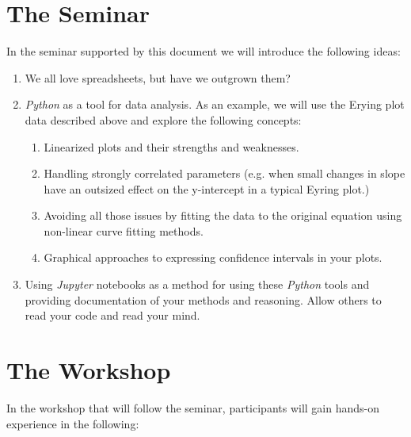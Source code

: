 \documentclass{tufte-handout}
\begin{document}
\section{The Seminar}

In the seminar supported by this document we will introduce the following ideas:

\begin{enumerate}

\item We all love spreadsheets, but have we outgrown them?

\item \textit{Python} as a tool for data analysis. As an example, we will use the Erying plot data described above and explore the following concepts:

\begin{enumerate}

\item Linearized plots and their strengths and weaknesses.
\item Handling strongly correlated parameters (e.g. when small changes in slope have an outsized effect on the y-intercept in a typical Eyring plot.)
\item Avoiding all those issues by fitting the data to the original equation using non-linear curve fitting methods.
\item Graphical approaches to expressing confidence intervals in your plots.

\end{enumerate}

\item Using \textit{Jupyter} notebooks as a method for using these \textit{Python} tools and providing documentation of your methods and reasoning. Allow others to read your code and read your mind.

\end{enumerate}


\section{The Workshop}

In the workshop that will follow the seminar, participants will gain hands-on experience in the following:
\end{document}
